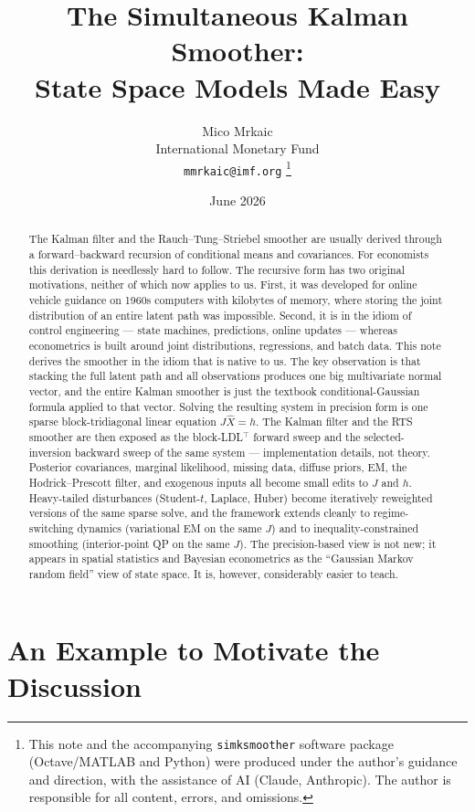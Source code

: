 \documentclass[11pt]{article}
\title{The Simultaneous Kalman Smoother:\\
State Space Models Made Easy}
\author{%
Mico Mrkaic\\
International Monetary Fund\\
\texttt{mmrkaic@imf.org}%
\thanks{%
This note and the accompanying \texttt{simksmoother} software package
(Octave/MATLAB and Python) were produced under the author's guidance
and direction, with the assistance of AI (Claude, Anthropic). The
author is responsible for all content, errors, and omissions.}%
}
\date{June 2026}
\begin{document}
\maketitle

\begin{abstract}
The Kalman filter and the Rauch--Tung--Striebel smoother are usually
derived through a forward--backward recursion of conditional means and
covariances.  For economists this derivation is needlessly hard to
follow.  The recursive form has two original motivations, neither of
which now applies to us.  First, it was developed for online vehicle
guidance on 1960s computers with kilobytes of memory, where storing the
joint distribution of an entire latent path was impossible.  Second, it
is in the idiom of control engineering --- state machines, predictions,
online updates --- whereas econometrics is built around joint
distributions, regressions, and batch data.  This note derives the
smoother in the idiom that is native to us.  The key observation is
that stacking the full latent path and all observations produces one
big multivariate normal vector, and the entire Kalman smoother is just
the textbook conditional-Gaussian formula applied to that vector.
Solving the resulting system in precision form is one sparse
block-tridiagonal linear equation $J\widehat X=h$.  The Kalman filter
and the RTS smoother are then exposed as the block-LDL$^\top$ forward
sweep and the selected-inversion backward sweep of the same system ---
implementation details, not theory.  Posterior covariances, marginal
likelihood, missing data, diffuse priors, EM, the Hodrick--Prescott
filter, and exogenous inputs all become small edits to $J$ and $h$.
Heavy-tailed disturbances (Student-$t$, Laplace, Huber) become
iteratively reweighted versions of the same sparse solve, and the
framework extends cleanly to regime-switching dynamics (variational
EM on the same $J$) and to inequality-constrained smoothing
(interior-point QP on the same $J$).  The precision-based view is not
new; it appears in spatial statistics and Bayesian econometrics as
the ``Gaussian Markov random field'' view of state space.  It is,
however, considerably easier to teach.
\end{abstract}

\section{An Example to Motivate the Discussion}
\label{sec:motivation}
\end{document}
